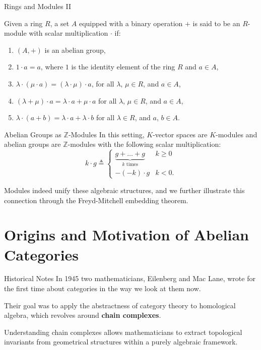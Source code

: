 \documentclass{beamer}
\newcommand{\ZZ}{\mathbb{Z}}
\begin{document}
\begin{frame}{Rings and Modules II}
    \begin{definition}[$R$-module]
        Given a ring $R$, a set $A$ equipped with a binary operation $+$ is said to be an $R$-module with
        scalar multiplication $\cdot$ if:
        \begin{enumerate}
            \item $(A, +)$ is an abelian group,
            \item $1 \cdot a = a$, where $1$ is the identity element of the ring $R$ and $a \in A$,
            \item $\lambda \cdot (\mu \cdot a) = (\lambda \cdot \mu) \cdot a$, for all $\lambda$, $\mu \in R$, and $a \in A$, 
            \item $(\lambda + \mu) \cdot a = \lambda \cdot a + \mu \cdot a$ for all $\lambda$, $\mu \in R$, and $a \in A$,
            \item $\lambda \cdot (a + b) = \lambda \cdot a + \lambda \cdot b$ for all $\lambda \in R$, and $a$, $b \in A$.
        \end{enumerate}
    \end{definition}
\end{frame}

\begin{frame}{Abelian Groups as \texorpdfstring{$\ZZ$}{ℤ}-Modules}
    In this setting, $K$-vector spaces are $K$-modules and abelian groups
    are $\ZZ$-modules with the following scalar multiplication:
    \[
        k \cdot g \triangleq \begin{cases}
            \underbrace{g + \ldots + g}_{k \text{ times}} & k \geq 0 \\
            -(-k) \cdot g & k < 0.
        \end{cases}
    \] \smallskip

    Modules indeed unify these algebraic structures, and we further illustrate this
    connection through the Freyd-Mitchell embedding theorem.
\end{frame}


\section{Origins and Motivation of Abelian Categories}

\begin{frame}{Historical Notes}
    In 1945 two mathematicians, Eilenberg and Mac Lane, wrote for the
    first time about categories in the way we look at them now. \medskip
    
    Their goal was to
    apply the abstractness of category theory to homological algebra, which revolves
    around \textbf{chain complexes}. \medskip

    Understanding chain complexes allows mathematicians to extract
    topological invariants from geometrical structures within a purely
    algebraic framework.
\end{frame}
\end{document}
